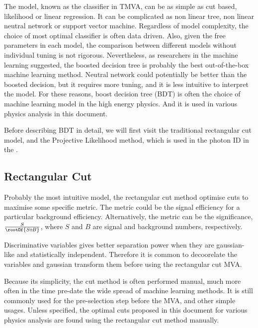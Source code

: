 The model, known as the classifier in TMVA, can be as simple as cut based, likelihood or linear regression. It can be complicated as non linear tree, non linear neutral network or support vector machine. Regardless of model complexity, the choice of most optimal classifier is often data driven. Also, given the free parameters in each model, the comparison between different models without individual tuning is not rigorous. Nevertheless, as researchers in the machine learning suggested, the boosted decision tree is probably the best out-of-the-box machine learning method. Neutral network could potentially be better than the boosted decision, but it requires more tuning, and it is less intuitive to interpret the model. For these reasons, boost decision tree (BDT) is often the choice of machine learning model in the high energy physics. And it is used in various physics analysis in this document.

Before describing BDT in detail, we will first visit the traditional rectangular cut model, and the Projective Likelihood method, which is used in the photon ID in the \pandora.



\subsection{Rectangular Cut}

Probably the most intuitive model, the rectangular cut method optimise cuts to maximise some specific metric. The metric could be the signal efficiency for a particular background efficiency. Alternatively, the metric can be the significance, $\frac{S}{\rootOf{S\!+\!B}}$, where $S$ and $B$ are signal and background numbers, respectively.

Discriminative variables gives better separation power when they are gaussian-like and statistically independent. Therefore it is common to decoorelate  the variables and gaussian transform them before using the rectangular cut MVA.

Because its simplicity, the cut method is often performed manual, much more often in the time pre-date the wide spread of machine learning methods. It is still commonly used for the pre-selection step before the MVA, and other simple usages. Unless specified, the optimal cuts proposed in this document for various physics analysis are found using the rectangular cut method manually.

